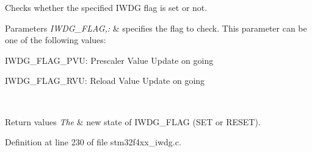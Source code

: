 Checks whether the specified I\-W\-D\-G flag is set or not. 


\begin{DoxyParams}{Parameters}
{\em I\-W\-D\-G\-\_\-\-F\-L\-A\-G,\-:} & specifies the flag to check. This parameter can be one of the following values\-: \begin{DoxyItemize}
\item I\-W\-D\-G\-\_\-\-F\-L\-A\-G\-\_\-\-P\-V\-U\-: Prescaler Value Update on going \item I\-W\-D\-G\-\_\-\-F\-L\-A\-G\-\_\-\-R\-V\-U\-: Reload Value Update on going \end{DoxyItemize}
\\
\hline
\end{DoxyParams}

\begin{DoxyRetVals}{Return values}
{\em The} & new state of I\-W\-D\-G\-\_\-\-F\-L\-A\-G (S\-E\-T or R\-E\-S\-E\-T). \\
\hline
\end{DoxyRetVals}


Definition at line 230 of file stm32f4xx\-\_\-iwdg.\-c.

